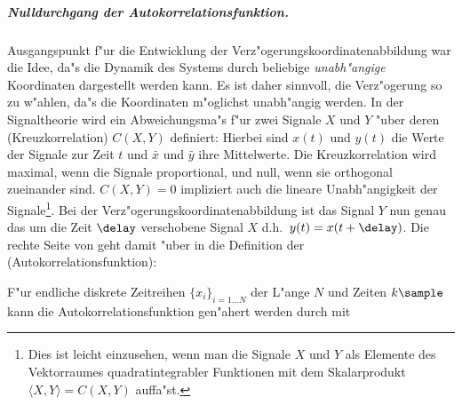 \subparagraph{Nulldurchgang der Autokorrelationsfunktion.} Ausgangspunkt f"ur die
Entwicklung der Verz"ogerungskoordinatenabbildung war die Idee, da"s die Dynamik des
Systems durch beliebige \emph{unabh"angige} Koordinaten dargestellt werden kann. Es ist
daher sinnvoll, die Verz"ogerung so zu w"ahlen, da"s die Koordinaten m"oglichst
unabh"angig werden. In der Signaltheorie wird ein Abweichungsma"s f"ur zwei Signale $X$
und $Y$ "uber deren \begriff(Kreuzkorrelation) $C(X,Y)$ definiert:
 Hierbei sind $x(t)$ und $y(t)$ die Werte der Signale zur
Zeit $t$ und $\bar x$ und $\bar y$ ihre Mittelwerte.  Die
Kreuzkorrelation wird maximal, wenn die Signale proportional, und null, wenn sie
orthogonal zueinander sind. $C(X,Y)=0$ impliziert auch die lineare Unabh"angigkeit der
Signale\footnote{Dies ist leicht einzusehen, wenn man die Signale $X$ und $Y$ als Elemente des
  Vektorraumes quadratintegrabler Funktionen mit dem Skalarprodukt $\langle X,Y \rangle=C(X,Y)$ auffa"st.}.
Bei der Verz"ogerungskoordinatenabbildung ist das Signal $Y$ nun genau das um die Zeit
$\delay$ verschobene Signal $X$ d.h.\ $y(t)=x(t+\delay)$.  Die rechte Seite von
 geht damit "uber in die Definition der \begriff(Autokorrelationsfunktion):


F"ur endliche diskrete Zeitreihen $\{x_i\}_{i=1\dots N}$ der L"ange $N$ und Zeiten
$k\sample$ kann die Autokorrelationsfunktion gen"ahert werden durch
mit

